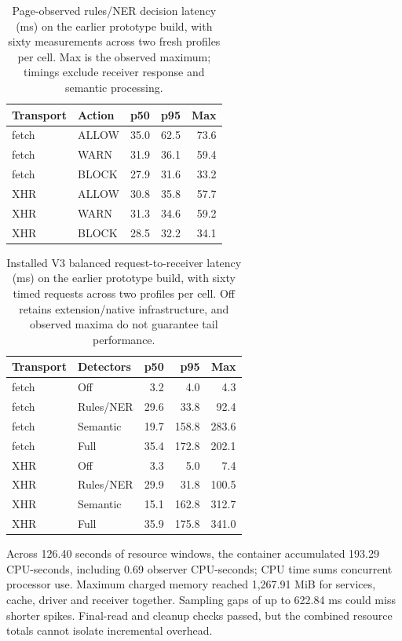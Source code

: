 \documentclass[sigconf]{acmart}
\theoremstyle{acmdefinition}\newtheorem{property}{Property}
\begin{document}
\begin{table}[!t]
\centering
\caption{Page-observed rules/NER decision latency (ms) on the earlier prototype build, with sixty measurements across two fresh profiles per cell. Max is the observed maximum; timings exclude receiver response and semantic processing.}
\label{tab:browser_cost}
\small
\begin{tabular}{llrrr}
\toprule
Transport & Action & p50 & p95 & Max \\
\midrule
fetch &ALLOW &35.0 &62.5 &73.6 \\
fetch &WARN &31.9 &36.1 &59.4 \\
fetch &BLOCK &27.9 &31.6 &33.2 \\
XHR &ALLOW &30.8 &35.8 &57.7 \\
XHR &WARN &31.3 &34.6 &59.2 \\
XHR &BLOCK &28.5 &32.2 &34.1 \\
\bottomrule
\end{tabular}
\end{table}

\begin{table}[!t]
\centering
\caption{Installed V3 balanced request-to-receiver latency (ms) on the earlier prototype build, with sixty timed requests across two profiles per cell. Off retains extension/native infrastructure, and observed maxima do not guarantee tail performance.}
\label{tab:v3_installed_cost}
\small
\begin{tabular}{llrrr}
\toprule
Transport & Detectors & p50 & p95 & Max \\
\midrule
fetch &Off &3.2 &4.0 &4.3 \\
fetch &Rules/NER &29.6 &33.8 &92.4 \\
fetch &Semantic &19.7 &158.8 &283.6 \\
fetch &Full &35.4 &172.8 &202.1 \\
XHR &Off &3.3 &5.0 &7.4 \\
XHR &Rules/NER &29.9 &31.8 &100.5 \\
XHR &Semantic &15.1 &162.8 &312.7 \\
XHR &Full &35.9 &175.8 &341.0 \\
\bottomrule
\end{tabular}
\end{table}

Across 126.40 seconds of resource windows, the container accumulated 193.29 CPU-seconds, including 0.69 observer CPU-seconds; CPU time sums concurrent processor use. Maximum charged memory reached 1,267.91 MiB for services, cache, driver and receiver together. Sampling gaps of up to 622.84 ms could miss shorter spikes. Final-read and cleanup checks passed, but the combined resource totals cannot isolate incremental overhead.
\end{document}
